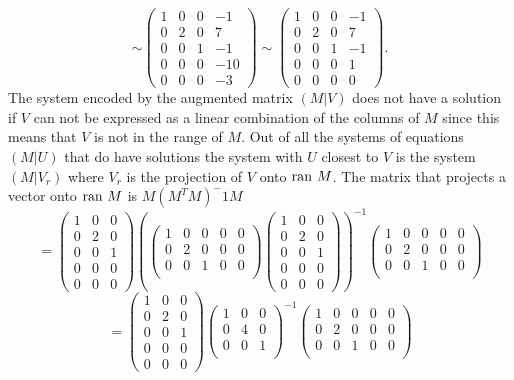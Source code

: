 \documentclass[12pt]{article}
\begin{document}
$$
\sim 
\left( \begin{array}{rrr|r}
1 &0&0&-1\\
0      &2&0&7\\
0&0&1&-1\\
0&0&0&-10\\
0&0&0&-3
\end{array} \right)
\sim 
\left( \begin{array}{rrr|r}
1 &0&0&-1\\
0      &2&0&7\\
0&0&1&-1\\
0&0&0&1\\
0&0&0&0
\end{array} \right).
$$
The system encoded by the augmented matrix $(M|V)$ does not have a solution if $V$ can not be expressed as a linear combination of the columns of $M$ since this means that $V$ is not in the range of $M$. 
Out of all the systems of equations $(M|U)$ that do have solutions the system with $U$ closest to $V$ is the system $(M|V_r)$ where $V_r$ is the projection of 
$V$ onto ${\rm ran~} M$. The matrix that projects a vector onto ${\rm ran~} M$ is 
$M(M^TM)^-1 M $
$$= 
\left( \begin{array}{rrr}
1 &0&0\\
0      &2&0\\
0&0&1\\
0&0&0\\
0&0&0
\end{array} \right)
\left(
\left( \begin{array}{rrrrr}
1 &0&0&0&0\\
0      &2&0&0&0\\
0&0&1&0&0\\
\end{array} \right)
\left( \begin{array}{rrr}
1 &0&0\\
0      &2&0\\
0&0&1\\
0&0&0\\
0&0&0
\end{array} \right)
\right)^{-1}
\left( \begin{array}{rrrrr}
1 &0&0&0&0\\
0      &2&0&0&0\\
0&0&1&0&0\\
\end{array} \right)
$$
$$= 
\left( \begin{array}{rrr}
1 &0&0\\
0      &2&0\\
0&0&1\\
0&0&0\\
0&0&0
\end{array} \right)
\left( \begin{array}{rrr}
1 &0&0\\
0      &4&0\\
0&0&1\\
\end{array} \right)^{-1}
\left( \begin{array}{rrrrr}
1 &0&0&0&0\\
0      &2&0&0&0\\
0&0&1&0&0\\
\end{array} \right)
$$
\end{document}
